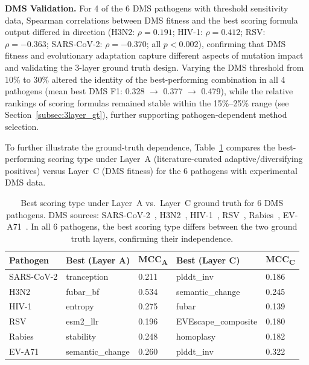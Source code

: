 \textbf{DMS Validation.}
\label{subsec:dms_evolution_correlation}
\label{tab:dms_threshold_sensitivity}
For 4 of the 6 DMS pathogens with threshold sensitivity data, Spearman correlations between DMS fitness and the best scoring formula output differed in direction (H3N2: $\rho = 0.191$; HIV-1: $\rho = 0.412$; RSV: $\rho = -0.363$; SARS-CoV-2: $\rho = -0.370$; all $p < 0.002$), confirming that DMS fitness and evolutionary adaptation capture different aspects of mutation impact and validating the 3-layer ground truth design.
Varying the DMS threshold from 10\% to 30\% altered the identity of the best-performing combination in all 4 pathogens (mean best DMS F1: 0.328 $\to$ 0.377 $\to$ 0.479), while the relative rankings of scoring formulas remained stable within the 15\%--25\% range (see Section~\ref{subsec:3layer_gt}), further supporting pathogen-dependent method selection.

To further illustrate the ground-truth dependence, Table~\ref{tab:layer_a_vs_c} compares the best-performing scoring type under Layer~A (literature-curated adaptive/diversifying positives) versus Layer~C (DMS fitness) for the 6 pathogens with experimental DMS data.

\begin{table}[htbp]
\centering
\caption{Best scoring type under Layer~A vs.\ Layer~C ground truth for 6 DMS pathogens. DMS sources: SARS-CoV-2~\cite{dadonaite2024nature}, H3N2~\cite{lee2018h3n2dms}, HIV-1~\cite{haddox2018hiv1dms}, RSV~\cite{simonich2026rsvdms}, Rabies~\cite{aditham2025rabies}, EV-A71~\cite{bakhache2025eva71}. In all 6 pathogens, the best scoring type differs between the two ground truth layers, confirming their independence.}
\label{tab:layer_a_vs_c}
\small
\begin{tabular}{lllll}
\toprule
\textbf{Pathogen} & \textbf{Best (Layer A)} & \textbf{MCC\textsubscript{A}} & \textbf{Best (Layer C)} & \textbf{MCC\textsubscript{C}} \\
\midrule
SARS-CoV-2 & tranception & 0.211 & plddt\_inv & 0.186 \\
H3N2 & fubar\_bf & 0.534 & semantic\_change & 0.245 \\
HIV-1 & entropy & 0.275 & fubar & 0.139 \\
RSV & esm2\_llr & 0.196 & EVEscape\_composite & 0.180 \\
Rabies & stability & 0.248 & homoplasy & 0.182 \\
EV-A71 & semantic\_change & 0.260 & plddt\_inv & 0.322 \\
\bottomrule
\end{tabular}
\end{table}

